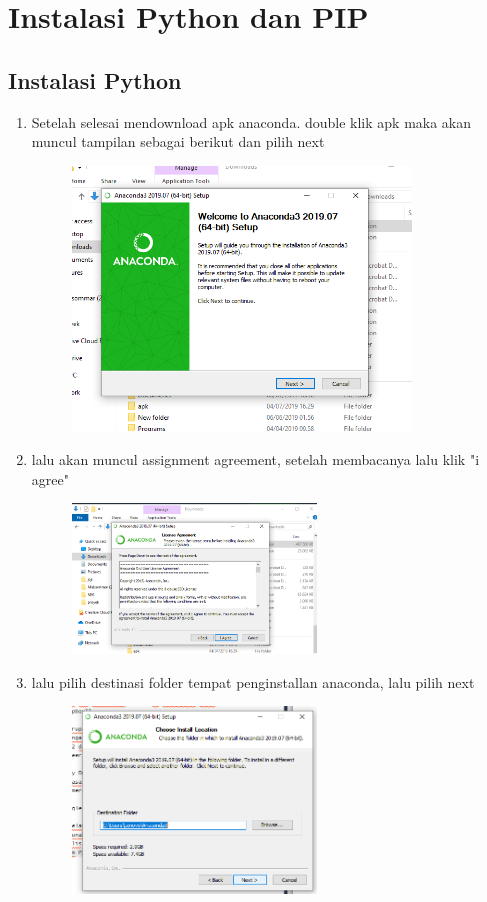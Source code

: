 \chapter*{Instalasi Python dan PIP}
\section*{Instalasi Python}

\begin{enumerate}
	\item Setelah selesai mendownload apk anaconda. double klik apk maka akan muncul tampilan sebagai berikut dan pilih next 
	\begin{figure} [h]
	\includegraphics[width=9cm]{section/picpyt/pyt1.png}
	\centering
	\end{figure}
	
	\item lalu akan muncul assignment agreement, setelah membacanya lalu klik "i agree"
	\begin{figure} [h]
	\includegraphics[width=6.5cm]{section/picpyt/pyt2.png}
	\centering
	\end{figure}
	
	\item lalu pilih destinasi folder tempat penginstallan anaconda, lalu pilih next 
	\begin{figure} [h]
	\includegraphics[width=6.5cm]{section/picpyt/pyt3.png}
	\centering
	\end{figure}
	

\end{enumerate}

